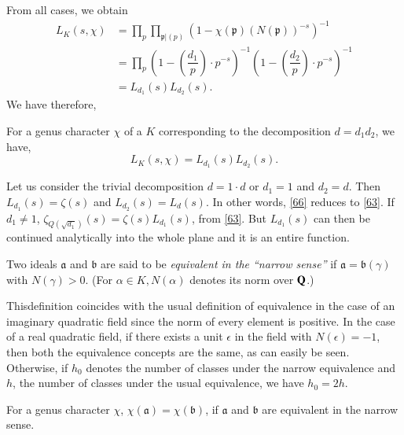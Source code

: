From all cases, we obtain
\begin{align*}
L_{K}(s,\chi) &=
\prod_{p}\prod_{\mathfrak{p}|(p)}(1-\chi(\mathfrak{p})(N(\mathfrak{p}))^{-s})^{-1}\\ 
&= \prod_{p}\left(1-\left(\dfrac{d_{1}}{p}\right)\cdot
p^{-s}\right)^{-1}\left(1-\left(\dfrac{d_{2}}{p}\right)\cdot
p^{-s}\right)^{-1}\\
&= L_{d_{1}}(s)L_{d_{2}}(s).
\end{align*}
We have therefore,

\begin{thm}[{\bf Kronecker}]\label{thm4}
For a genus character $\chi$ of a $K$ corresponding to the
decomposition $d=d_{1}d_{2}$, we have,
\begin{equation*}
L_{K}(s,\chi)=L_{d_{1}}(s)L_{d_{2}}(s).\tag{66}\label{66}
\end{equation*}
\end{thm}

Let us consider the trivial decomposition $d=1\cdot d$ or $d_{1}=1$
and $d_{2}=d$. Then $L_{d_{1}}(s)=\zeta(s)$ and
$L_{d_{2}}(s)=L_{d}(s)$. In other words, \eqref{66} reduces to
\eqref{63}. If $d_{1}\neq 1$,
$\zeta_{Q(\sqrt{d_{1}})}(s)=\zeta(s)L_{d_{1}}(s)$, from
\eqref{63}. But $L_{d_{1}}(s)$ can then be continued analytically into
the whole plane and it is an entire function.

Two ideals $\mathfrak{a}$ and $\mathfrak{b}$ are said to be {\em
  equivalent in the ``narrow sense''} if
$\mathfrak{a}=\mathfrak{b}(\gamma)$ with $N(\gamma)>0$. (For
$\alpha\in K,N(\alpha)$ denotes its norm over $\mathbf{Q}$.)

This\pageoriginale definition coincides with the usual definition of
equivalence in the case of an imaginary quadratic field since the norm
of every element is positive. In the case of a real quadratic field,
if there exists a unit $\epsilon$ in the field with $N(\epsilon)=-1$,
then both the equivalence concepts are the same, as can easily be
seen. Otherwise, if $h_{0}$ denotes the number of classes under the
narrow equivalence and $h$, the number of classes under the usual
equivalence, we have $h_{0}=2h$.

\begin{proposition}\label{prop10}
For a genus character $\chi$, $\chi(\mathfrak{a})=\chi(\mathfrak{b})$,
if $\mathfrak{a}$ and $\mathfrak{b}$ are equivalent in the narrow sense.
\end{proposition}

